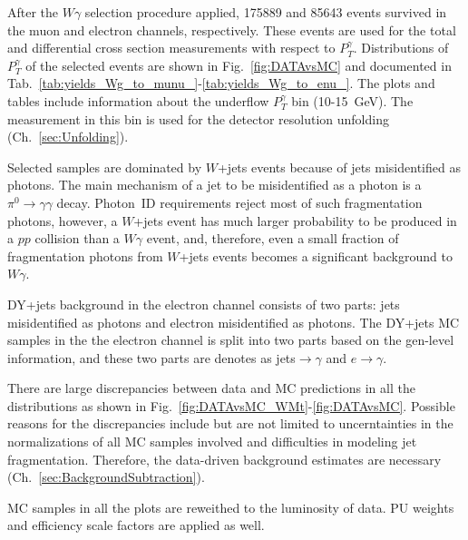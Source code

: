 After the $W\gamma$ selection procedure applied, 175889 and 85643 events survived in the muon and electron channels, respectively. These events are used for the total and differential cross section measurements with respect to $P_T^{\gamma}$. Distributions of $P_T^{\gamma}$ of the selected events are shown in Fig.~\ref{fig:DATAvsMC} and documented in Tab.~\ref{tab:yields_Wg_to_munu_}-\ref{tab:yields_Wg_to_enu_}. The plots and tables include information about the underflow $P_T^{\gamma}$ bin (10-15~GeV). The measurement in this bin is used for the detector resolution unfolding (Ch.~\ref{sec:Unfolding}). 

Selected samples are dominated by $W$+jets events because of jets misidentified as photons. The main mechanism of a jet to be misidentified as a photon is a $\pi^0 \rightarrow \gamma\gamma$ decay. Photon~ID requirements reject most of such fragmentation photons, however, a $W$+jets event has much larger probability to be produced in a $pp$ collision than a $W\gamma$ event, and, therefore, even a small fraction of fragmentation photons from $W$+jets events becomes a significant background to $W\gamma$.  

DY+jets background in the electron channel consists of two parts: jets misidentified as photons and electron misidentified as photons. The DY+jets MC samples in the the electron channel is split into two parts based on the gen-level information, and these two parts are denotes as jets$\rightarrow\gamma$ and $e\rightarrow\gamma$.

There are large discrepancies between data and MC predictions in all the distributions as shown in Fig.~\ref{fig:DATAvsMC_WMt}-\ref{fig:DATAvsMC}. Possible reasons for the discrepancies include but are not limited to uncerntainties in the normalizations of all MC samples involved and difficulties in modeling jet fragmentation. Therefore, the data-driven background estimates are necessary (Ch.~\ref{sec:BackgroundSubtraction}).

MC samples in all the plots are reweithed to the luminosity of data. PU weights and efficiency scale factors are applied as well.

